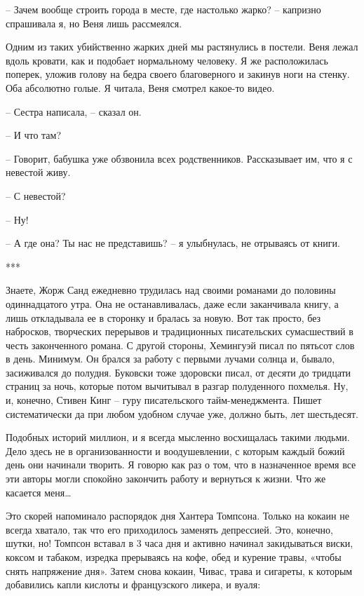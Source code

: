 \documentclass[
]{book}
\begin{document}
-- Зачем вообще строить города в месте, где настолько жарко? -- капризно спрашивала я, но Веня лишь рассмеялся.

Одним из таких убийственно жарких дней мы растянулись в постели. Веня лежал вдоль кровати, как и подобает нормальному человеку. Я же расположилась поперек, уложив голову на бедра своего благоверного и закинув ноги на стенку. Оба абсолютно голые. Я читала, Веня смотрел какое-то видео.

-- Сестра написала, -- сказал он.

-- И что там?

-- Говорит, бабушка уже обзвонила всех родственников. Рассказывает им, что я с невестой живу.

-- С невестой?

-- Ну!

-- А где она? Ты нас не представишь? -- я улыбнулась, не отрываясь от книги.

***

Знаете, Жорж Санд ежедневно трудилась над своими романами до половины одиннадцатого утра. Она не останавливалась, даже если заканчивала книгу, а лишь откладывала ее в сторонку и бралась за новую. Вот так просто, без набросков, творческих перерывов и традиционных писательских сумасшествий в честь законченного романа. С другой стороны, Хемингуэй писал по пятьсот слов в день. Минимум. Он брался за работу с первыми лучами солнца и, бывало, засиживался до полудня. Буковски тоже здоровски писал, от десяти до тридцати страниц за ночь, которые потом вычитывал в разгар полуденного похмелья. Ну, и, конечно, Стивен Кинг -- гуру писательского тайм-менеджмента. Пишет систематически да при любом удобном случае уже, должно быть, лет шестьдесят.

Подобных историй миллион, и я всегда мысленно восхищалась такими людьми. Дело здесь не в организованности и воодушевлении, с которым каждый божий день они начинали творить. Я говорю как раз о том, что в назначенное время все эти авторы могли спокойно закончить работу и вернуться к жизни. Что же касается меня\ldots{}

Это скорей напоминало распорядок дня Хантера Томпсона. Только на кокаин не всегда хватало, так что его приходилось заменять депрессией. Это, конечно, шутки, но! Томпсон вставал в 3 часа дня и активно начинал закидываться виски, коксом и табаком, изредка прерываясь на кофе, обед и курение травы, «чтобы снять напряжение дня». Затем снова кокаин, Чивас, трава и сигареты, к которым добавились капли кислоты и французского ликера, и вуаля:
\end{document}
